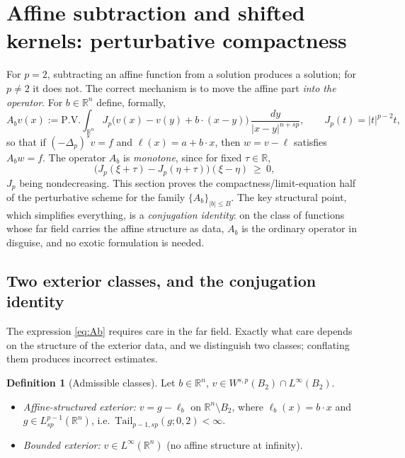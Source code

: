 \documentclass[11pt]{amsart}
\theoremstyle{plain}
\theoremstyle{definition}
\newtheorem{definition}[theorem]{Definition}
\theoremstyle{remark}
\newcommand{\R}{\mathbb{R}}
\newcommand{\fpl}[1]{(-\Delta_p)^{s}#1}
\newcommand{\Jp}[1]{|#1|^{p-2}#1}
\newcommand{\Tail}{\mathrm{Tail}_{p-1,sp}}
\begin{document}
\section{Affine subtraction and shifted kernels: perturbative compactness}
\label{sec:shifted}
For $p=2$, subtracting an affine function from a solution produces a solution;
for $p\neq2$ it does not. The correct mechanism is to move the affine part
\emph{into the operator}. For $b\in\R^n$ define, formally,
\begin{equation}\label{eq:Ab}
  A_b v(x):=\mathrm{P.V.}\!\int_{\R^n}
   J_p\big(v(x)-v(y)+b\cdot(x-y)\big)\,\frac{dy}{|x-y|^{n+sp}},
  \qquad J_p(t)=\Jp{t},
\end{equation}
so that if $\fpl{v}=f$ and $\ell(x)=a+b\cdot x$, then $w=v-\ell$ satisfies
$A_bw=f$. The operator $A_b$ is \emph{monotone}, since for fixed $\tau\in\R$,
\begin{equation}\label{eq:mono}
  \big(J_p(\xi+\tau)-J_p(\eta+\tau)\big)(\xi-\eta)\ \ge\ 0,
\end{equation}
$J_p$ being nondecreasing. This section proves the compactness/limit-equation
half of the perturbative scheme for the family $\{A_b\}_{|b|\le B}$. The key
structural point, which simplifies everything, is a \emph{conjugation
identity}: on the class of functions whose far field carries the affine
structure as data, $A_b$ is the ordinary operator in disguise, and no
exotic formulation is needed.

\subsection{Two exterior classes, and the conjugation identity}
The expression \eqref{eq:Ab} requires care in the far field. Exactly what
care depends on the structure of the exterior data, and we distinguish two
classes; conflating them produces incorrect estimates.

\begin{definition}[Admissible classes]\label{def:classes}
Let $b\in\R^n$, $v\in W^{s,p}(B_2)\cap L^\infty(B_2)$.
\begin{itemize}[leftmargin=2em]
\item[\textnormal{(A)}] \emph{Affine-structured exterior:} $v=g-\ell_b$ on
$\R^n\setminus B_2$, where $\ell_b(x)=b\cdot x$ and $g\in L^{p-1}_{sp}(\R^n)$,
i.e.\ $\Tail(g;0,2)<\infty$.
\item[\textnormal{(B)}] \emph{Bounded exterior:} $v\in L^\infty(\R^n)$
\textnormal{(}no affine structure at infinity\textnormal{)}.
\end{itemize}
\end{definition}
\end{document}
